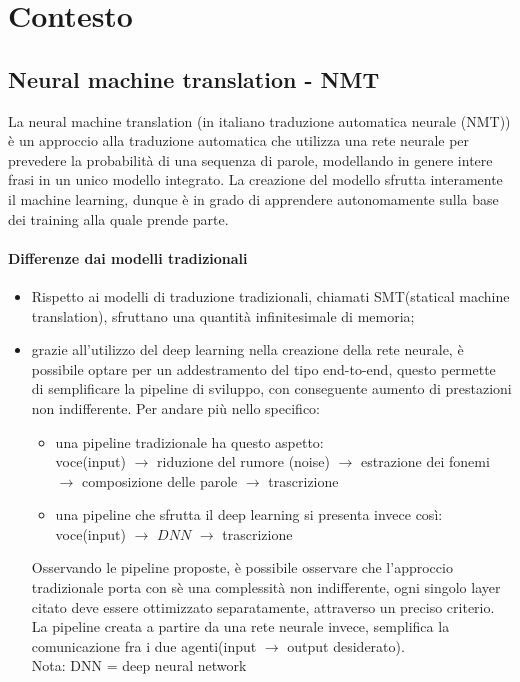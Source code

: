 \clearpage{\pagestyle{empty}\cleardoublepage}
\chapter{Contesto}                %
\lhead[\fancyplain{}{\bfseries\thepage}]{\fancyplain{}{\bfseries\rightmark}}
\section{Neural machine translation - NMT}                 %
La neural machine translation (in italiano traduzione automatica neurale (NMT))  è un approccio alla traduzione automatica che utilizza una rete neurale per prevedere la probabilità di una sequenza di parole, modellando in genere intere frasi in un unico modello integrato. La creazione del modello sfrutta interamente il machine learning, dunque è in grado di apprendere autonomamente sulla base dei training alla quale prende parte. 

\subsubsection{Differenze dai modelli tradizionali}

\begin{itemize}
	\item Rispetto ai modelli di traduzione tradizionali, chiamati SMT(statical machine translation), sfruttano una quantità infinitesimale di memoria;
	\item grazie all'utilizzo del deep learning nella creazione della rete neurale, è possibile optare per un addestramento del tipo end-to-end, questo permette di semplificare la pipeline di sviluppo, con conseguente aumento di prestazioni non indifferente. Per andare più nello specifico:
	\begin{itemize}
		\item una pipeline tradizionale ha questo aspetto: 
		\\
		voce(input) $\rightarrow$ riduzione del rumore (noise)   $\rightarrow$ estrazione dei fonemi $\rightarrow$ composizione delle parole $\rightarrow$ trascrizione
		\item una pipeline che sfrutta il deep learning si presenta invece così:
		\\
		voce(input) $\rightarrow$ $DNN$  $\rightarrow$ trascrizione	 
	\end{itemize}
	Osservando le pipeline proposte, è possibile osservare che l'approccio tradizionale porta con sè una complessità non indifferente, ogni singolo layer citato deve essere ottimizzato separatamente, attraverso un preciso criterio. La pipeline creata a partire da una rete neurale invece, semplifica la comunicazione fra i due agenti(input $\rightarrow$ output desiderato).
	\\ 
	Nota: DNN = deep neural network
\end{itemize}

